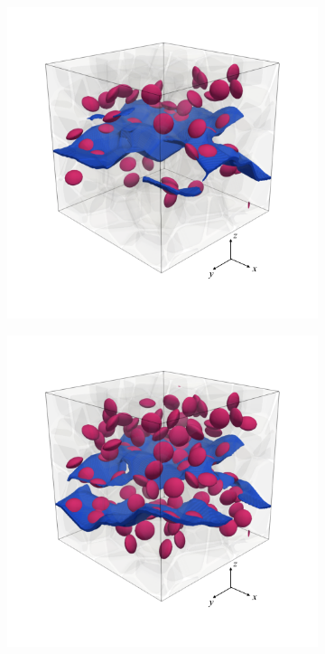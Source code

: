 \begin{figure}[!htbp]
\begin{subfigure}{0.32\textwidth}
    \caption{}
    \label{b150_ini}
  \end{subfigure}
  \begin{subfigure}{0.32\textwidth}
    \centering
    \includegraphics[width=\textwidth]{Chapter3/figures/b50_end}
    \caption{}
    \label{b50_end}
  \end{subfigure}
  \begin{subfigure}{0.32\textwidth}
    \centering
    \includegraphics[width=\textwidth]{Chapter3/figures/b100_end}

\end{subfigure}
\end{figure}
